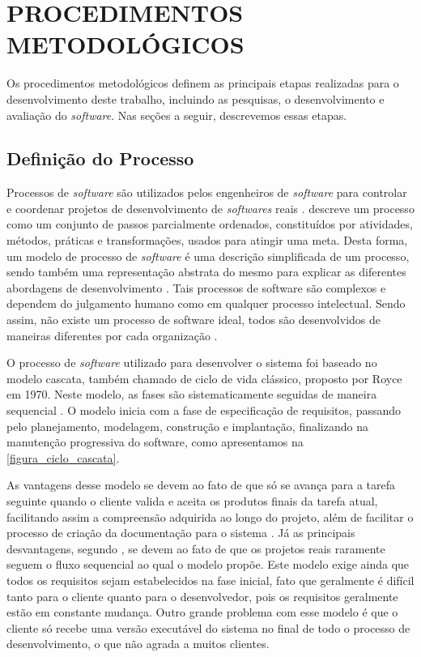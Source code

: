 \section{PROCEDIMENTOS METODOLÓGICOS}

Os procedimentos metodológicos definem as principais etapas realizadas para o desenvolvimento deste trabalho, incluindo as pesquisas, o desenvolvimento e avaliação do \textit{software}. Nas seções a 
seguir, descrevemos essas etapas.

\subsection{Definição do Processo}

Processos de \textit{software} são utilizados pelos engenheiros de \textit{software} para controlar e coordenar projetos de desenvolvimento de \textit{softwares} reais \cite{talma2006desenvolvimento}. 
 descreve um processo como um conjunto de passos parcialmente  ordenados, constituídos por atividades, métodos, práticas e transformações, usados para atingir uma meta. 
Desta forma, um modelo de processo de \textit{software} é uma descrição simplificada de um processo, sendo também uma representação abstrata do mesmo para explicar as diferentes abordagens de 
desenvolvimento \cite{sommerville2003engenharia}. Tais processos de software são complexos e dependem do julgamento humano como em qualquer processo intelectual. Sendo assim, não existe um processo 
de software ideal, todos são desenvolvidos de maneiras 
diferentes por cada organização \cite{sommerville2003engenharia}.

O processo de \textit{software} utilizado para desenvolver o sistema foi baseado no modelo cascata, também chamado de ciclo de vida clássico, proposto por Royce em 1970. Neste modelo, as fases são 
sistematicamente seguidas de maneira sequencial \cite{pressman2006engenharia}. O modelo inicia com a fase de especificação de requisitos, passando pelo planejamento, modelagem, construção e 
implantação, finalizando na manutenção progressiva do software, como apresentamos na \autoref{figura_ciclo_cascata}.

As vantagens desse modelo se devem ao fato de que só se avança para a tarefa seguinte quando o cliente valida e aceita os produtos finais da tarefa atual, facilitando assim a compreensão adquirida ao 
longo do projeto, além de facilitar o processo de criação da documentação para o sistema \cite{pressman2006engenharia}. Já as principais desvantagens, segundo , se 
devem ao fato de que os projetos reais raramente seguem o fluxo sequencial ao qual o modelo propõe. Este modelo exige ainda que todos os requisitos sejam estabelecidos na fase 
inicial, fato que geralmente é difícil tanto para o cliente quanto para o desenvolvedor, pois os requisitos geralmente est\~ao em constante mudan\c{c}a. Outro grande problema com esse modelo é que o 
cliente só recebe uma versão executável do sistema no final de todo o processo de desenvolvimento, o que não agrada a muitos clientes.

